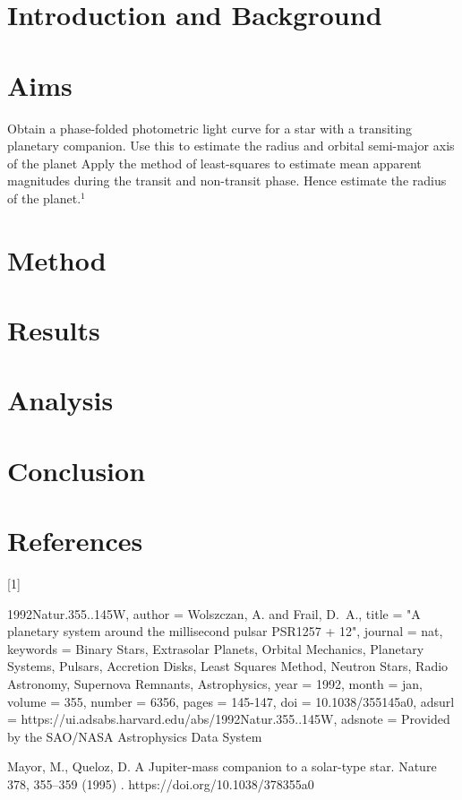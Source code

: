 \documentclass[]{article}
\begin{document}
  \par
  


\newpage
\section*{Introduction and Background}

\section*{Aims}

Obtain a phase-folded photometric light curve for a star with a transiting 
planetary companion. Use this to estimate the radius and orbital semi-major 
axis of the planet
Apply the method of least-squares to estimate mean apparent magnitudes 
during the transit and non-transit phase. Hence estimate the radius of the planet.$^1$


\section*{Method}

\section*{Results}

\section*{Analysis}


\section*{Conclusion}

\section*{References}
\newpage

[1] {1992Natur.355..145W,
       author = {{Wolszczan}, A. and {Frail}, D.~A.},
        title = "{A planetary system around the millisecond pulsar PSR1257 + 12}",
      journal = {nat},
     keywords = {Binary Stars, Extrasolar Planets, Orbital Mechanics, Planetary Systems, Pulsars, Accretion Disks, Least Squares Method, Neutron Stars, Radio Astronomy, Supernova Remnants, Astrophysics},
         year = 1992,
        month = jan,
       volume = {355},
       number = {6356},
        pages = {145-147},
          doi = {10.1038/355145a0},
       adsurl = {https://ui.adsabs.harvard.edu/abs/1992Natur.355..145W},
      adsnote = {Provided by the SAO/NASA Astrophysics Data System}

      
}\parskip 0.2cm
\noindent
[2] Mayor, M., Queloz, D. A Jupiter-mass companion to a solar-type star. Nature 378, 355–359 (1995)
. https://doi.org/10.1038/378355a0\parskip 0.2cm
\end{document}
